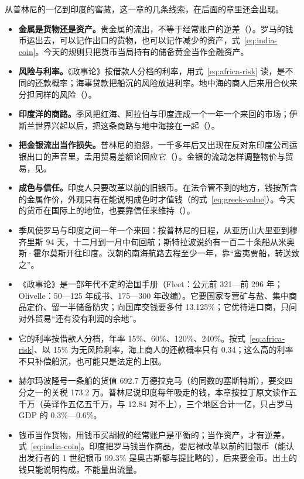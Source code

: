 从普林尼的一亿到印度的窖藏，这一章的几条线索，在后面的章里还会出现。
\begin{itemize}
\item \textbf{金属是货物还是资产。}贵金属的流出，不等于经常账户的逆差（）。罗马的钱币运出去，可以记作出口的货物，也可以记作减少的资产，式~\eqref{eq:india-coin}。今天的规则只把货币当局持有的储备黄金当作金融资产。
\item \textbf{风险与利率。}《政事论》按借款人分档的利率，用式~\eqref{eq:africa-risk} 读，是不同的还款概率；海事贷款把船沉的风险放进利率。地中海的商人后来用合伙来分担同样的风险（）。
\item \textbf{印度洋的商路。}季风把红海、阿拉伯与印度连成一个一年一个来回的市场；伊斯兰世界兴起以后，把这条商路与地中海接在一起（）。
\item \textbf{把金银流出当作损失。}普林尼的抱怨，一千多年后又出现在反对东印度公司运银出口的声音里，孟用贸易差额论回应它（）。金银的流动怎样调整物价与贸易，见。
\item \textbf{成色与信任。}印度人只要改革以前的旧银币。在法令管不到的地方，钱按所含的金属作价，外观只有在能说明成色时才值钱（的式~\eqref{eq:greek-value}）。今天的货币在国际上的地位，也要靠信任来维持（）。
\end{itemize}

\begin{takeaways}
\begin{itemize}
\item 季风使罗马与印度之间一年一个来回：按普林尼的日程，从亚历山大里亚到穆齐里斯 94 天，十二月到一月中旬回航；斯特拉波说约有一百二十条船从米奥斯·霍尔莫斯开往印度。汉朝的南海航路去程至少一年，靠“蛮夷贾船，转送致之”。
\item 《政事论》是一部年代不定的治国手册（Fleet：公元前 321—前 296 年；Olivelle：50—125 年成书、175—300 年改编）。它要国家专营矿与盐、集中商品定价、留一半储备防灾；向国库交钱要多付 13.125\%；它优待进口商，只问对外贸易“还有没有利润的余地”。
\item 它的利率按借款人分档，年率 15\%、60\%、120\%、240\%。按式~\eqref{eq:africa-risk}、以 15\% 为无风险利率，海上商人的还款概率只有 0.34；这么高的利率不只补偿船沉，也可能只是法定的上限。
\item 赫尔玛波隆号一条船的货值 692.7 万德拉克马（约同数的塞斯特斯），要交四分之一的关税 173.2 万。普林尼说印度每年吸走的钱，本章按拉丁原文读作五千万（英译作五亿五千万，与 12.84 对不上），三个地区合计一亿，只占罗马 GDP 的 0.3\%—0.6\%。
\item 钱币当作货物，用钱币买胡椒的经常账户是平衡的；当作资产，才有逆差，式~\eqref{eq:india-coin}。印度把罗马钱当作商品，要尼禄改革以前的旧银币（能认出发行者的 1 世纪银币 99.3\% 是奥古斯都与提比略的），后来要金币。出土的钱只能说明构成，不能量出流量。
\end{itemize}
\end{takeaways}

